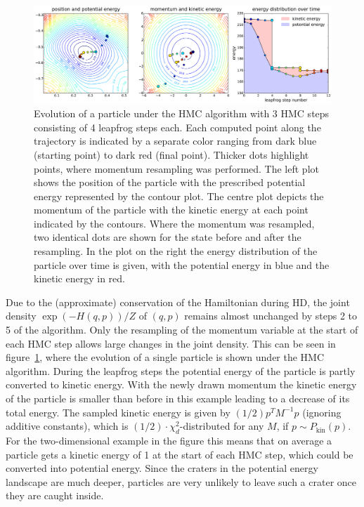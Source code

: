\begin{figure}[t]
\centering
\includegraphics[width=2.05\columnwidth]{figures/hmc_motion_3hmc_04lf.pdf}
\caption{Evolution of a particle under the HMC algorithm with 3 HMC steps consisting of 4 leapfrog steps each. Each computed point along the trajectory is indicated by a separate color ranging from dark blue (starting point) to dark red (final point). Thicker dots highlight points, where momentum resampling was performed. The left plot shows the position of the particle with the prescribed potential energy represented by the contour plot. The centre plot depicts the momentum of the particle with the kinetic energy at each point indicated by the contours. Where the momentum was resampled, two identical dots are shown for the state before and after the resampling. In the plot on the right the energy distribution of the particle over time is given, with the potential energy in blue and the kinetic energy in red.}
\label{fig:HMC_MOTION_3hmc_04lf}
\end{figure}

Due to the (approximate) conservation of the Hamiltonian during HD, the joint density $\exp \left( -H(q, p) \right)/Z$ of $(q,p)$ remains almost unchanged by steps 2 to 5 of the algorithm. Only the resampling of the momentum variable at the start of each HMC step allows large changes in the joint density. This can be seen in figure~\ref{fig:HMC_MOTION_3hmc_04lf}, where the evolution of a single particle is shown under the HMC algorithm. During the leapfrog steps the potential energy of the particle is partly converted to kinetic energy. With the newly drawn momentum the kinetic energy of the particle is smaller than before in this example leading to a decrease of its total energy. The sampled kinetic energy is given by $(1/2) p^T M^{-1} p$ (ignoring additive constants), which is $(1/2) \cdot \chi^2_d$-distributed for any $M$, if $p \sim P_\textrm{kin}(p)$. For the two-dimensional example in the figure this means that on average a particle gets a kinetic energy of 1 at the start of each HMC step, which could be converted into potential energy. Since the craters in the potential energy landscape are much deeper, particles are very unlikely to leave such a crater once they are caught inside.

